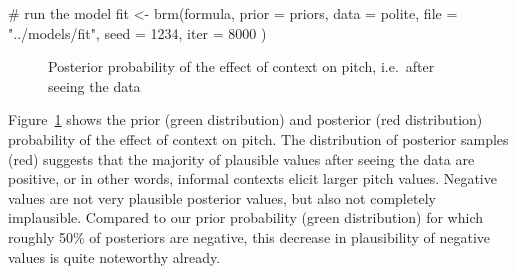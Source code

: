 \documentclass[
  doc,
  floatsintext,
  longtable,
  nolmodern,
  notxfonts,
  notimes,
  colorlinks=true,linkcolor=blue,citecolor=blue,urlcolor=blue]{apa7}
\newenvironment{Shaded}{\begin{snugshade}}{\end{snugshade}}
\newcommand{\AttributeTok}[1]{\textcolor[rgb]{0.40,0.45,0.13}{#1}}
\newcommand{\CommentTok}[1]{\textcolor[rgb]{0.37,0.37,0.37}{#1}}
\newcommand{\DecValTok}[1]{\textcolor[rgb]{0.68,0.00,0.00}{#1}}
\newcommand{\FunctionTok}[1]{\textcolor[rgb]{0.28,0.35,0.67}{#1}}
\newcommand{\NormalTok}[1]{\textcolor[rgb]{0.00,0.23,0.31}{#1}}
\newcommand{\OtherTok}[1]{\textcolor[rgb]{0.00,0.23,0.31}{#1}}
\newcommand{\StringTok}[1]{\textcolor[rgb]{0.13,0.47,0.30}{#1}}
\begin{document}
\begin{Shaded}
\begin{Highlighting}[]
\CommentTok{\# run the model}
\NormalTok{fit }\OtherTok{\textless{}{-}} \FunctionTok{brm}\NormalTok{(formula, }\AttributeTok{prior =}\NormalTok{ priors, }\AttributeTok{data =}\NormalTok{ polite,}
           \AttributeTok{file  =} \StringTok{"../models/fit"}\NormalTok{,}
           \AttributeTok{seed =} \DecValTok{1234}\NormalTok{, }\AttributeTok{iter =} \DecValTok{8000}
\NormalTok{           )}
\end{Highlighting}
\end{Shaded}

\begin{figure}[!tbp]

\caption{\label{fig-plot-posterior}Posterior probability of the effect
of context on pitch, i.e.~after seeing the data}


\end{figure}%

Figure~\ref{fig-plot-posterior} shows the prior (green distribution) and
posterior (red distribution) probability of the effect of context on
pitch. The distribution of posterior samples (red) suggests that the
majority of plausible values after seeing the data are positive, or in
other words, informal contexts elicit larger pitch values. Negative
values are not very plausible posterior values, but also not completely
implausible. Compared to our prior probability (green distribution) for
which roughly 50\% of posteriors are negative, this decrease in
plausibility of negative values is quite noteworthy already.
\end{document}
